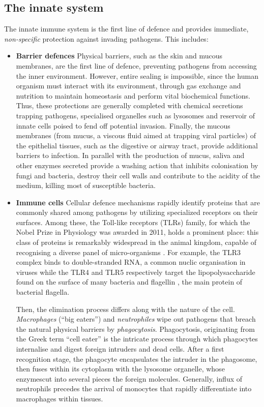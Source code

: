 \subsection{The innate system}
\label{subsec:innate-system}
The innate immune system is the first line of defence and provides immediate, \emph{non-specific} protection against invading pathogens.  This includes:
\begin{itemize}
    \item \textbf{Barrier defences} Physical barriers, such as the skin and mucous membranes, are the first line of defence, preventing pathogens from accessing the inner environment. However, entire sealing is impossible, since the human organism must interact with its environment, through gas exchange and nutrition to maintain homeostasis and perform vital biochemical functions. Thus, these protections are generally completed with chemical secretions trapping pathogens, specialised organelles such as lysosomes and reservoir of innate cells poised to fend off potential invasion. Finally, the mucous membranes (from mucus, a viscous fluid aimed at trapping viral particles) of the \gls{epithelial} tissues, such as the digestive or airway tract, provide additional barriers to infection. In parallel with the production of mucus, saliva and other enzymes secreted provide a washing action that inhibits colonisation by fungi and bacteria, destroy their cell walls and contribute to the acidity of the medium, killing most of susceptible bacteria.  
    
    \item \textbf{Immune cells} Cellular defence mechanisms rapidly identify proteins that are commonly shared among pathogens by utilizing specialized receptors on their surfaces. Among these, the Toll-like receptors (TLRs) family, for which the Nobel Prize in Physiology was awarded in 2011, holds a prominent place: this class of proteins is remarkably widespread in the animal kingdom, capable of recognising a diverse panel of micro-organisms \autocite{akira_takeda04}. For example, the TLR3 complex binds to double-stranded RNA, a common nuclic organisation in viruses \autocite{matsumoto_seya08} while the TLR4 and TLR5 respectively target the lipopolysaccharide found on the surface of many bacteria \autocite{takeuchi_etal99} and flagellin \autocite{gewirtz_etal01}, the main protein of bacterial flagella. 

    Then, the elimination process differs along with the nature of the cell. \emph{Macrophages} (\enquote{big eaters}) and \emph{neutrophiles} wipe out pathogens that breach the natural physical barriers by \emph{phagocytosis}. Phagocytosis, originating from the Greek term \enquote{cell eater} is the intricate process through which phagocytes internalise and digest foreign intruders and dead cells. After a first recognition stage, the phagocyte encapsulates the intruder in the phagosome, then fuses within its cytoplasm with the lysosome organelle, whose enzymescut into several pieces the foreign molecules. Generally, influx of neutrophils precedes the arrival of monocytes that rapidly differentiate into macrophages within tissues. 
    

\end{itemize}
